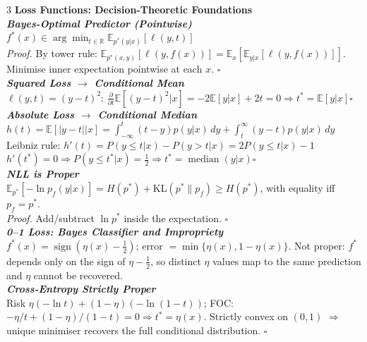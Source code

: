 \documentclass[a4paper,7pt]{article}
\begin{document}
\begin{multicols*}{3}
\textbf{Loss Functions: Decision-Theoretic Foundations}\\

\textit{\textbf{Bayes-Optimal Predictor (Pointwise)}}\\
$f^*(x)\in\arg\min_{t\in\mathbb{R}}\mathbb{E}_{p^*(y|x)}[\ell(y,t)]$\\
\textit{Proof.} By tower rule: $\mathbb{E}_{p^*(x,y)}[\ell(y,f(x))]=\mathbb{E}_x[\mathbb{E}_{y|x}[\ell(y,f(x))]]$. Minimise inner expectation pointwise at each $x$. \hfill$\square$\\

\textit{\textbf{Squared Loss $\to$ Conditional Mean}}\\
$\ell(y,t)=(y-t)^2$: $\frac{\partial}{\partial t}\mathbb{E}[(y-t)^2|x]=-2\mathbb{E}[y|x]+2t=0\Rightarrow t^*=\mathbb{E}[y|x]$\hfill$\square$\\

\textit{\textbf{Absolute Loss $\to$ Conditional Median}}\\
$h(t)=\mathbb{E}[|y-t||x]=\int_{-\infty}^t(t-y)p(y|x)\,dy+\int_t^\infty(y-t)p(y|x)\,dy$\\
Leibniz rule: $h'(t)=P(y\leq t|x)-P(y>t|x)=2P(y\leq t|x)-1$\\
$h'(t^*)=0\Rightarrow P(y\leq t^*|x)=\tfrac{1}{2}\Rightarrow t^*=\operatorname{median}(y|x)$\hfill$\square$\\

\textit{\textbf{NLL is Proper}}\\
$\mathbb{E}_{p^*}[-\ln p_f(y|x)]=H(p^*)+\mathrm{KL}(p^*\|p_f)\geq H(p^*)$, with equality iff $p_f=p^*$.\\
\textit{Proof.} Add/subtract $\ln p^*$ inside the expectation. \hfill$\square$\\

\textit{\textbf{0--1 Loss: Bayes Classifier and Impropriety}}\\
$f^*(x)=\operatorname{sign}(\eta(x)-\tfrac{1}{2})$; error $=\min\{\eta(x),1-\eta(x)\}$. Not proper: $f^*$ depends only on the sign of $\eta-\tfrac{1}{2}$, so distinct $\eta$ values map to the same prediction and $\eta$ cannot be recovered.\\

\textit{\textbf{Cross-Entropy Strictly Proper}}\\
Risk $\eta(-\ln t)+(1-\eta)(-\ln(1-t))$; FOC: $-\eta/t+(1-\eta)/(1-t)=0\Rightarrow t^*=\eta(x)$. Strictly convex on $(0,1)$ $\Rightarrow$ unique minimiser recovers the full conditional distribution. \hfill$\square$\\


\end{multicols*}
\end{document}
